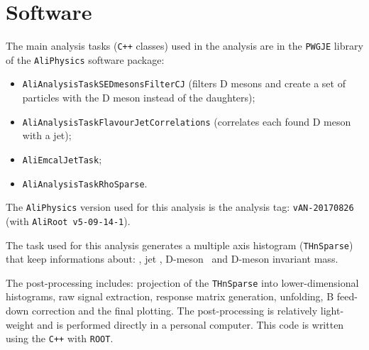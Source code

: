 \section{Software}

The main analysis tasks (\texttt{C++} classes) used in the analysis are in the \texttt{PWGJE} library of the \texttt{AliPhysics} software package:
\begin{itemize}
\item \texttt{AliAnalysisTaskSEDmesonsFilterCJ} (filters D mesons and create a set of particles with the D meson instead of the daughters);
\item \texttt{AliAnalysisTaskFlavourJetCorrelations} (correlates each found D meson with a jet);
\item \texttt{AliEmcalJetTask};
\item \texttt{AliAnalysisTaskRhoSparse}.
\end{itemize}
The \texttt{AliPhysics} version used for this analysis is the analysis tag: \texttt{vAN-20170826} (with \texttt{AliRoot v5-09-14-1}).

The task used for this analysis generates a multiple axis histogram (\texttt{THnSparse}) that keep informations about: \zpar, jet \pt, D-meson \pt\ and D-meson invariant mass.

The post-processing includes: projection of the \texttt{THnSparse} into lower-dimensional histograms, raw signal extraction, response matrix generation, unfolding, B feed-down correction and the final plotting.
The post-processing is relatively light-weight and is performed directly in a personal computer. This code is written using the \texttt{C++} with \texttt{ROOT}.

%

